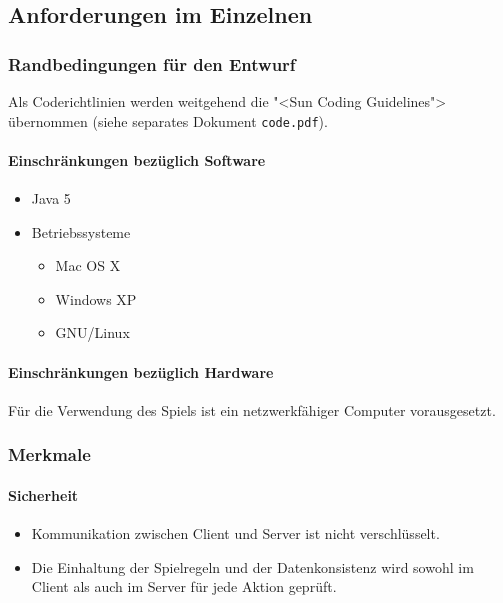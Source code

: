 \documentclass[12pt,halfparskip]{scrartcl}
\begin{document}
\subsection{Anforderungen im Einzelnen}\label{sub:anforderungen_im_einzelnen} %
\subsubsection{Randbedingungen für den Entwurf}\label{ssub:randbedingungen_für_den_entwurf} %

Als Coderichtlinien werden weitgehend die "<Sun Coding Guidelines"> übernommen (siehe separates Dokument \texttt{code.pdf}).

\paragraph{Einschränkungen bezüglich Software}\label{ssub:einschränkungen_bzgl_software} %
\begin{itemize}
	\item Java 5
	\item Betriebssysteme
	\begin{itemize}
		\item Mac OS X
		\item Windows XP
		\item GNU/Linux
	\end{itemize}
\end{itemize}


\paragraph{Einschränkungen bezüglich Hardware}\label{ssub:einschränkungen_bzgl_hardware} %

Für die Verwendung des Spiels ist ein netzwerkfähiger Computer vorausgesetzt.


\subsubsection{Merkmale}\label{ssub:merkmale} %
\paragraph{Sicherheit}\label{ssub:sicherheit} %
\begin{itemize}
	\item Kommunikation zwischen Client und Server ist nicht verschlüsselt.
	\item Die Einhaltung der Spielregeln und der Datenkonsistenz wird sowohl im Client als auch im Server für jede Aktion geprüft.
\end{itemize}
\end{document}
